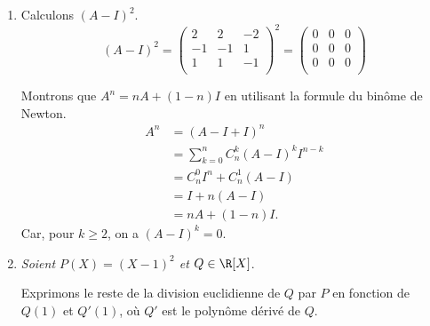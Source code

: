 {{\begin {enumerate}
La matrice $A$ admet une valeur propre triple qui est $\lambda=1$, elle ne peut pas \^etre diagonalisable sinon son sous-espace propre serait de dimension $3$ or, $A\neq I$.
  \item Calculons $(A-I)^2$.
$$(A-I)^2=\begin{pmatrix}2&2&-2 \\  -1&-1&1 \\ 1&1&-1 \\ \end{pmatrix}^2=\begin{pmatrix}0&0&0 \\  0&0&0 \\ 0&0&0 \\ \end{pmatrix}$$

 Montrons que $A^n=nA+(1-n)I$ en utilisant la formule du bin\^ome de Newton.
\begin{align*}
A^n &= (A-I+I)^n \\
&= \sum_{k=0}^{n}C_n^k(A-I)^kI^{n-k} \\
&= C_n^0I^n+C_n^1(A-I) \\
&= I+n(A-I) \\
&= nA+(1-n)I.
\end{align*}
Car, pour $k\geq2$, on a $(A-I)^k=0$.
  \item  {\it Soient $P(X)=(X-1)^2$ et $Q\in\R[X]$}. 

Exprimons le reste de la division euclidienne de $Q$ par $P$ en fonction de $Q(1)$ et $Q'(1)$, o\`u $Q'$ est le polyn\^ome d\'eriv\'e de $Q$. 


\end{enumerate}}}
